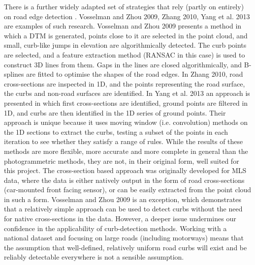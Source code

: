 There is a further widely adapted set of strategies that rely (partly on entirely) on road edge detection . Vosselman and Zhou 2009, Zhang 2010, Yang et al. 2013 are examples of such research. Vosselman and Zhou 2009 presents a method in which a DTM is generated, points close to it are selected in the point cloud, and small, curb-like jumps in elevation are algorithmically detected. The curb points are selected, and a feature extraction method (RANSAC in this case) is used to construct 3D lines from them. Gaps in the lines are closed algorithmically, and B-splines are fitted to optimise the shapes of the road edges. In Zhang 2010, road cross-sections are inspected in 1D, and the points representing the road surface, the curbs and non-road surfaces are identified. In Yang et al. 2013 an approach is presented in which first cross-sections are identified, ground points are filtered in 1D, and curbs are then identified in the 1D series of ground points. Their approach is unique because it uses moving window (i.e. convolution) methods on the 1D sections to extract the curbs, testing a subset of the points in each iteration to see whether they satisfy a range of rules. While the results of these methods are more flexible, more accurate and more complete in general than the photogrammetric methods, they are not, in their original form, well suited for this project. The cross-section based approach was originally developed for MLS data, where the data is either natively output in the form of road cross-sections (car-mounted front facing sensor), or can be easily extracted from the point cloud in such a form. Vosselman and Zhou 2009 is an exception, which demonstrates that a relatively simple approach can be used to detect curbs without the need for native cross-sections in the data. However, a deeper issue undermines our confidence in the applicability of curb-detection methods. Working with a national dataset and focusing on large roads (including motorways) means that the assumption that well-defined, relatively uniform road curbs will exist and be reliably detectable everywhere is not a sensible assumption.

